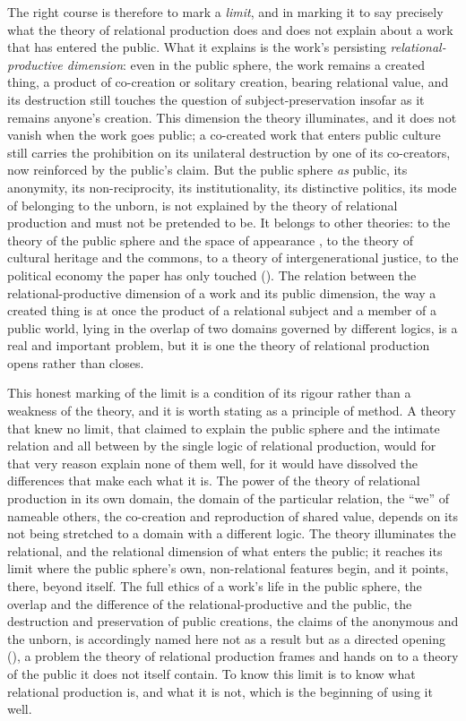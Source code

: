 The right course is therefore to mark a \emph{limit}, and in marking it to say precisely what the theory of relational production does and does not explain about a work that has entered the public. What it explains is the work's persisting \emph{relational-productive dimension}: even in the public sphere, the work remains a created thing, a product of co-creation or solitary creation, bearing relational value, and its destruction still touches the question of subject-preservation insofar as it remains anyone's creation. This dimension the theory illuminates, and it does not vanish when the work goes public; a co-created work that enters public culture still carries the prohibition on its unilateral destruction by one of its co-creators, now reinforced by the public's claim. But the public sphere \emph{as} public, its anonymity, its non-reciprocity, its institutionality, its distinctive politics, its mode of belonging to the unborn, is not explained by the theory of relational production and must not be pretended to be. It belongs to other theories: to the theory of the public sphere and the space of appearance \parencite{habermas1989,arendt1958}, to the theory of cultural heritage and the commons, to a theory of intergenerational justice, to the political economy the paper has only touched (). The relation between the relational-productive dimension of a work and its public dimension, the way a created thing is at once the product of a relational subject and a member of a public world, lying in the overlap of two domains governed by different logics, is a real and important problem, but it is one the theory of relational production opens rather than closes.

This honest marking of the limit is a condition of its rigour rather than a weakness of the theory, and it is worth stating as a principle of method. A theory that knew no limit, that claimed to explain the public sphere and the intimate relation and all between by the single logic of relational production, would for that very reason explain none of them well, for it would have dissolved the differences that make each what it is. The power of the theory of relational production in its own domain, the domain of the particular relation, the ``we'' of nameable others, the co-creation and reproduction of shared value, depends on its not being stretched to a domain with a different logic. The theory illuminates the relational, and the relational dimension of what enters the public; it reaches its limit where the public sphere's own, non-relational features begin, and it points, there, beyond itself. The full ethics of a work's life in the public sphere, the overlap and the difference of the relational-productive and the public, the destruction and preservation of public creations, the claims of the anonymous and the unborn, is accordingly named here not as a result but as a directed opening (), a problem the theory of relational production frames and hands on to a theory of the public it does not itself contain. To know this limit is to know what relational production is, and what it is not, which is the beginning of using it well.
